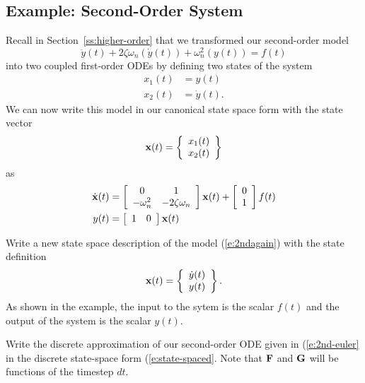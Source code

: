 \subsection{Example: Second-Order System}
Recall in Section~\ref{ss:higher-order} that we transformed our second-order model 
\begin{equation}\label{e:2ndagain}
\ddot{y}(t) + 2 \zeta \omega_n (\dot{y}(t)) + \omega_n^2 (y(t)) = f(t)
\end{equation}
into two coupled first-order ODEs by defining two states of the system
\begin{align}\label{e:2states}
x_1(t) & = y(t) \nonumber \\
x_2(t) & = \dot{y}(t).
\end{align}
We can now write this model in our canonical state space form with the state vector
\[
\mbox{${\bf x}$}(t)  =  \left\{ \begin{array}{c}
x_1(t) \\
x_2(t) 
\end{array} \right\}
\]
as 
\begin{align}\label{e:state-space-2d}
\dot{\mbox{${\bf x}$}}(t) & = \left[ \begin{array}{cc}
0 & 1 \\
-\omega_n^2 & -2 \zeta \omega_n  
\end{array} \right] \mbox{${\bf x}$}(t) + 
\left[ \begin{array}{c}
0 \\
1
\end{array}\right]
f(t) \nonumber \\
y(t) & = \left[ \begin{array}{cc} 1 & 0 \end{array} \right] \mbox{${\bf x}$}(t)
\end{align}

\begin{ex}
Write a new state space description of the model (\ref{e:2ndagain}) with the state definition
\[
\mbox{${\bf x}$}(t)  =  \left\{ \begin{array}{c}
\dot{y}(t) \\
y(t)
\end{array} \right\}.
\]
As shown in the example, the input to the sytem is the scalar $f(t)$ and the output of the system is the scalar $y(t)$. 
\end{ex}

\begin{ex}
Write the discrete approximation of our second-order ODE given in (\ref{e:2nd-euler} in the discrete state-space form (\ref{e:state-spaced}.  Note that $\mbox{${\bf F}$}$ and $\mbox{${\bf G}$}$ will be functions of the timestep $dt$.
\end{ex}



